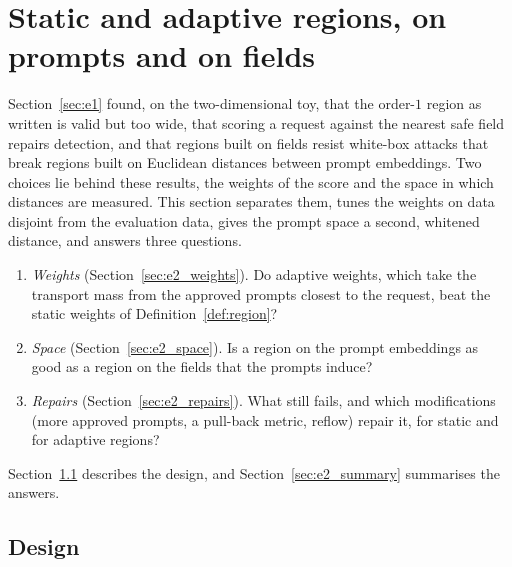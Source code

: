\documentclass{article}
\theoremstyle{plain}
\theoremstyle{remark}
\begin{document}
\section{Static and adaptive regions, on prompts and on fields}\label{sec:e2}

Section~\ref{sec:e1} found, on the two-dimensional toy, that the order-$1$ region as written is valid but too wide, that scoring
a request against the nearest safe field repairs detection, and that regions built on fields resist white-box attacks that
break regions built on Euclidean distances between prompt embeddings. Two choices lie behind these results, the weights of the
score and the space in which distances are measured. This section separates them, tunes the weights on data disjoint from the
evaluation data, gives the prompt space a second, whitened distance, and answers three questions.
\begin{enumerate}[label=(Q\arabic*)]
\item \emph{Weights} (Section~\ref{sec:e2_weights}). Do adaptive weights, which take the transport mass from the approved prompts
closest to the request, beat the static weights of Definition~\ref{def:region}?
\item \emph{Space} (Section~\ref{sec:e2_space}). Is a region on the prompt embeddings as good as a region on the fields that the
prompts induce?
\item \emph{Repairs} (Section~\ref{sec:e2_repairs}). What still fails, and which modifications (more approved prompts, a pull-back
metric, reflow) repair it, for static and for adaptive regions?
\end{enumerate}
Section~\ref{sec:e2_design} describes the design, and Section~\ref{sec:e2_summary} summarises the answers.

\subsection{Design}\label{sec:e2_design}
\end{document}
